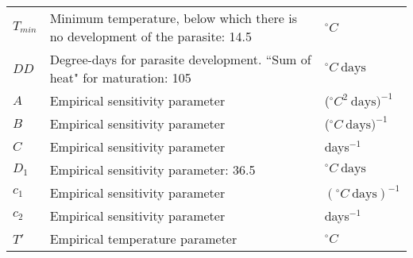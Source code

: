 \documentclass[a4paper,fleqn]{cas-dc}
\begin{document}
\begin{table}[width=2.0\linewidth,cols=3,pos=h]
\begin{tabular*}{\tblwidth}{@{} LLL@{} }
$T_{min}$  & Minimum temperature, below which there is no development of the parasite: 14.5 & $^\circ C$ \\ 
$DD$  & Degree-days for parasite development.
             ``Sum of heat" for maturation: 105 \cite{McCord2016, Lindsay_Birley_1996} & $^\circ C \ \text{days}$ \\ 
$A$  & Empirical sensitivity parameter & ($^\circ C^2 \ \text{days})^{-1}$ \\ 
$B$  & Empirical sensitivity parameter & ($^\circ C \ \text{days})^{-1}$ \\ 
$C$  & Empirical sensitivity parameter & days$^{-1}$ \\ 
$D_1$  & Empirical sensitivity parameter: 36.5 & $^\circ C \ \text{days}$ \\ 
$c_1$  & Empirical sensitivity parameter & $(^\circ C \ \text{days})^{-1}$ \\ 
$c_2$  & Empirical sensitivity parameter & days$^{-1}$ \\ 
$T'$  & Empirical temperature parameter & $^\circ C$ \\ 
\bottomrule
\end{tabular*}
\end{table}

\printcredits

%





\end{document}
